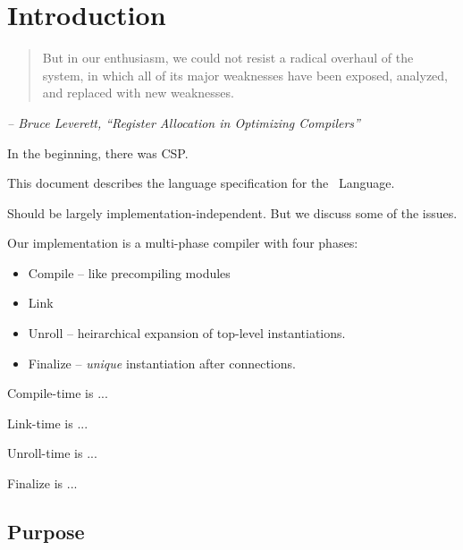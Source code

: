

\chapter{Introduction}
\label{sec:intro}

\begin{quotation}
But in our enthusiasm, we could not resist a radical overhaul of the
system, in which all of its major weaknesses have been exposed,
analyzed, and replaced with new weaknesses.
\end{quotation}

\begin{flushright}
{\itshape -- Bruce Leverett, ``Register Allocation in Optimizing Compilers''}
\end{flushright}

\bigskip


In the beginning, there was CSP\cite{ref:csp}.

This document describes the language specification for the \artxx\ Language.  

Should be largely implementation-independent.  
But we discuss some of the issues.  

Our implementation is a multi-phase compiler with four phases:
\begin{itemize}
\item Compile -- like precompiling modules
\item Link
\item Unroll -- heirarchical expansion of top-level instantiations.  
\item Finalize -- \emph{unique} instantiation after connections.  
\end{itemize}

Compile-time is ...

Link-time is ...

Unroll-time is ...

Finalize is ...



\section{Purpose}
\label{sec:intro:purpose}

